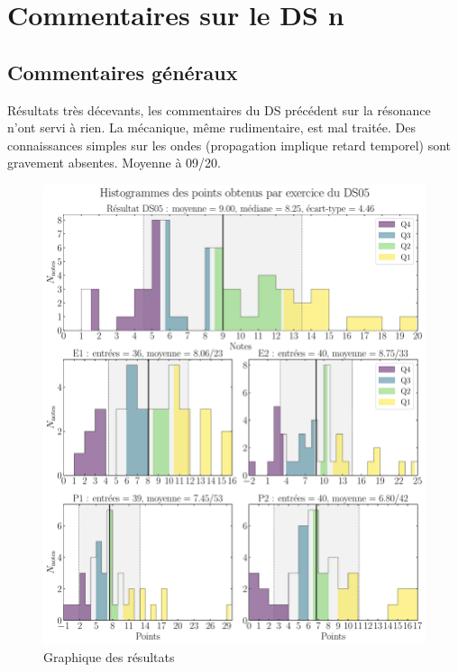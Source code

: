 \documentclass[a4paper, 12pt, final, garamond]{book}
\begin{document}
\setcounter{chapter}{4}

\chapter{Commentaires sur le DS n}

\section{Commentaires généraux}

Résultats très décevants, les commentaires du DS précédent sur la résonance
n'ont servi à rien. La mécanique, même rudimentaire, est mal traitée. Des
connaissances simples sur les ondes (propagation implique retard temporel) sont
gravement absentes. Moyenne à 09/20.

\begin{figure}[htbp!]
	\centering
	\includegraphics[width=.9\linewidth]{DS05_hist_all}
	\caption{Graphique des résultats}
\end{figure}
\end{document}
